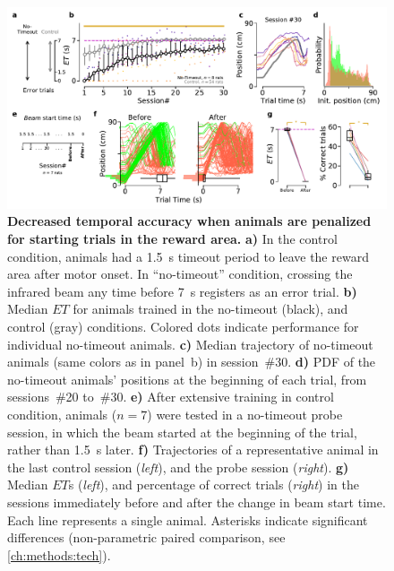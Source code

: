  \begin{figure}[bt!]
  \begin{center}
    \includegraphics[width=\textwidth]{ch-time/figures/NToTrd.pdf}
    \caption[No-Timeout Condition]
    {\textbf{Decreased temporal accuracy when animals are penalized for starting trials in the reward area.}
    \textbf{a)}
    In the control condition, animals had a 1.5~s timeout period to leave the reward area after motor onset.
    In ``no-timeout'' condition, crossing the infrared beam any time before 7~s registers as an error trial.
    \textbf{b)}
    Median $ET$ for animals trained in the no-timeout (black), and control (gray) conditions.
    Colored dots indicate performance for individual no-timeout animals.
    \textbf{c)}
    Median trajectory of no-timeout animals (same colors as in panel~b) in session~\#30.
    \textbf{d)}
    PDF of the no-timeout animals' positions at the beginning of each trial, from sessions~\#20 to~\#30.
    \textbf{e)}
    After extensive training in control condition, animals ($n=7$) were tested in a no-timeout probe session, in which the beam started at the beginning of the trial, rather than 1.5~s later.
    \textbf{f)}
    Trajectories of a representative animal in the last control session (\textit{left}), and the probe session (\textit{right}).
    \textbf{g)}
    Median $ET$s (\textit{left}), and percentage of correct trials (\textit{right}) in the sessions immediately before and after the change in beam start time.
    Each line represents a single animal.
    Asterisks indicate significant differences (non-parametric paired comparison, see \autoref{ch:methods:tech}).
    }
    \label{fig:time:ntoTrd}
  \end{center}
\end{figure}
